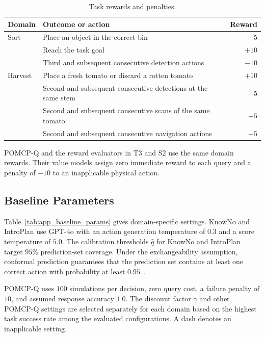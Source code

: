 \begin{table}[!htbp]
\centering
\caption{Task rewards and penalties.}
\label{tab:app_rewards}
\small
\begin{tabularx}{\textwidth}{@{}lXr@{}}
\toprule
Domain & Outcome or action & Reward \\
\midrule
Sort & Place an object in the correct bin & $+5$ \\
 & Reach the task goal & $+10$ \\
 & Third and subsequent consecutive detection actions & $-10$ \\
\addlinespace[3pt]
Harvest & Place a fresh tomato or discard a rotten tomato & $+10$ \\
 & Second and subsequent consecutive detections at the same stem & $-5$ \\
 & Second and subsequent consecutive scans of the same tomato & $-5$ \\
 & Second and subsequent consecutive navigation actions & $-5$ \\
\bottomrule
\end{tabularx}
\end{table}

POMCP-Q and the reward evaluators in T3 and S2 use the same domain rewards. Their value models assign zero immediate reward to each query and a penalty of $-10$ to an inapplicable physical action.

\subsection{Baseline Parameters}\label{appx:baseline_configs}
Table~\ref{tab:app_baseline_params} gives domain-specific settings. KnowNo and IntroPlan use GPT-4o with an action generation temperature of $0.3$ and a score temperature of $5.0$. The calibration thresholds $\hat{q}$ for KnowNo and IntroPlan target $95\%$ prediction-set coverage. Under the exchangeability assumption, conformal prediction guarantees that the prediction set contains at least one correct action with probability at least $0.95$~\citep{ren2023robots}. 

POMCP-Q uses $100$ simulations per decision, zero query cost, a failure penalty of $10$, and assumed response accuracy $1.0$. The discount factor $\gamma$ and other POMCP-Q settings are selected separately for each domain based on the highest task success rate among the evaluated configurations. A dash denotes an inapplicable setting.

